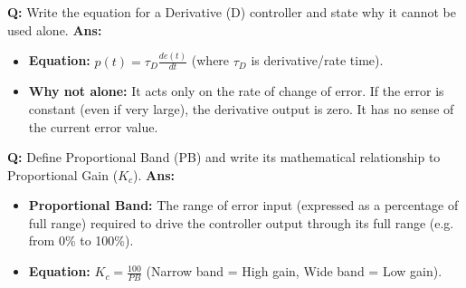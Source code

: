 \documentclass[10pt,a4paper,twocolumn]{article}
\begin{document}
\begin{tcolorbox}[
  colback=white,
  colframe=UnitColorTwo,
  colbacktitle=gray!10!white,
  coltitle=black,
  fonttitle=\bfseries\sffamily\small,
  title={Unit II $\bullet$ Card 3: Derivative (D) Control Action (Rate)},
  boxrule=1.2pt,
  arc=2mm,
  outer arc=2mm,
  boxsep=1.5mm,
  top=1mm,
  bottom=1mm,
  left=1.5mm,
  right=1.5mm,
  before skip=2.5mm,
  after skip=2.5mm
]
\textbf{Q:} Write the equation for a Derivative (D) controller and state why it cannot be used alone.
\tcbline
\textbf{Ans:} \begin{itemize}
  \item   \textbf{Equation:} $p(t) = \tau_D \frac{de(t)}{dt}$ (where $\tau_D$ is derivative/rate time).
  \item   \textbf{Why not alone:} It acts only on the rate of change of error. If the error is constant (even if very large), the derivative output is zero. It has no sense of the current error value.
\end{itemize}
\end{tcolorbox}


\begin{tcolorbox}[
  colback=white,
  colframe=UnitColorTwo,
  colbacktitle=gray!10!white,
  coltitle=black,
  fonttitle=\bfseries\sffamily\small,
  title={Unit II $\bullet$ Card 4: Proportional Band vs Proportional Gain},
  boxrule=1.2pt,
  arc=2mm,
  outer arc=2mm,
  boxsep=1.5mm,
  top=1mm,
  bottom=1mm,
  left=1.5mm,
  right=1.5mm,
  before skip=2.5mm,
  after skip=2.5mm
]
\textbf{Q:} Define Proportional Band (PB) and write its mathematical relationship to Proportional Gain ($K_c$).
\tcbline
\textbf{Ans:} \begin{itemize}
  \item   \textbf{Proportional Band:} The range of error input (expressed as a percentage of full range) required to drive the controller output through its full range (e.g. from 0\% to 100\%).
  \item   \textbf{Equation:} $K_c = \frac{100}{PB}$ (Narrow band = High gain, Wide band = Low gain).
\end{itemize}
\end{tcolorbox}
\end{document}
